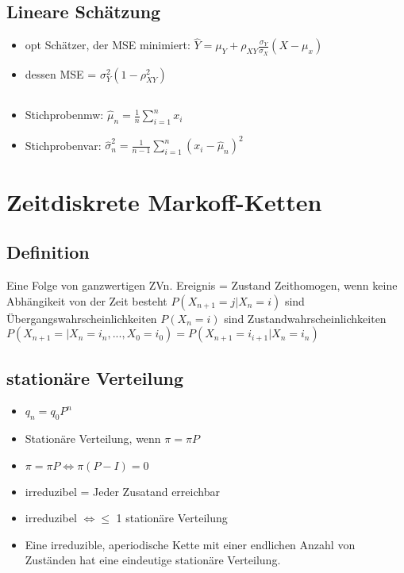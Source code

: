 \documentclass{article}
\begin{document}
\subsection{Lineare Schätzung}
\begin{itemize}
\item opt Schätzer, der MSE minimiert: \newline $\hat{Y} = \mu_Y + \rho_{XY}\frac{\sigma_Y}{\sigma_X} (X-\mu_x) $
\item dessen MSE = $\sigma_Y^2(1-\rho_{XY}^2)$
\end{itemize}

\subsection{}
\begin{itemize}
\item Stichprobenmw: $\hat{\mu}_n = \frac{1}{n} \sum_{i=1}^n x_i$
\item Stichprobenvar: $\hat{\sigma}_n^2 = \frac{1}{n-1} \sum_{i=1}^n(x_i-\hat{\mu}_n)^2$
\end{itemize}


\section{Zeitdiskrete Markoff-Ketten}
\subsection{Definition}

Eine Folge von ganzwertigen ZVn. \newline
Ereignis = Zustand \newline
Zeithomogen, wenn keine Abhängikeit von der Zeit besteht \newline
$P(X_{n+1} = j | X_n = i)$ sind Übergangswahrscheinlichkeiten \newline
$P(X_n = i)$ sind Zustandwahrscheinlichkeiten \newline
$P(X_{n+1} = | X_n = i_n , ..., X_0 = i_0) = P(X_{n+1} = i_{i+1} | X_n = i_n)$


\subsection{station{\"a}re Verteilung}
\begin{itemize}
\item $q_n = q_0 P^n$
\item Station{\"a}re Verteilung, wenn $\pi = \pi P$ 
\item $\pi = \pi P \Leftrightarrow \pi(P - I) = 0$
\item irreduzibel = Jeder Zusatand erreichbar
\item irreduzibel $\Leftrightarrow \leq $ 1 stationäre Verteilung
\item Eine irreduzible, aperiodische Kette mit einer endlichen Anzahl von Zuständen hat eine eindeutige stationäre Verteilung.
\end{itemize}
\end{document}
